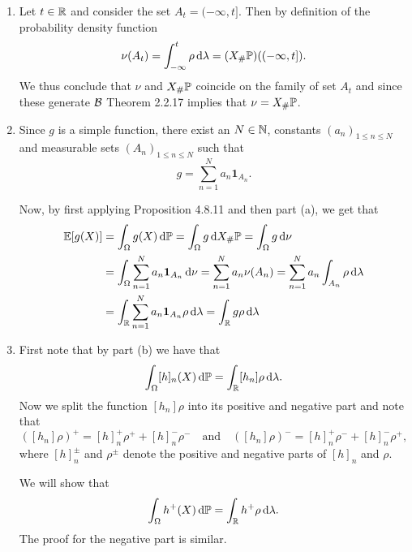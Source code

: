 \begin{enumerate}[label=(\alph*)]
\item Let $t \in \mathbb R$ and consider the set $A_t = (-\infty, t]$. Then by definition of the probability density function
\[
	\nu(A_t) = \int_{-\infty}^t \rho \, \mathrm{d} \lambda = (X_\# \mathbb P)((-\infty, t]).
\]
We thus conclude that $\nu$ and $X_\# \mathbb P$ coincide on the family of set $A_t$ and since these generate $\mathcal B$ Theorem 2.2.17 implies that $\nu = X_\# \mathbb P$.
\item Since $g$ is a simple function, there exist an $N \in \mathbb N$, constants $(a_n)_{1 \le n \le N}$ and measurable sets $(A_n)_{1 \le n \le N}$ such that
\[
	g = \sum_{n = 1}^N a_n \mathbf{1}_{A_n}.
\]

Now, by first applying Proposition 4.8.11 and then part (a), we get that
\begin{align*}
	\mathbb E[g(X)] &= \int_{\Omega} g(X) \, \mathrm{d} \mathbb P
		= \int_{\Omega} g \, \mathrm{d} X_\# \mathbb P 
		= \int_\Omega g \, \mathrm{d} \nu \\
	&= \int_\Omega \sum_{n = 1}^N a_n \mathbf{1}_{A_n} \, \mathrm{d} \nu 
		= \sum_{n = 1}^N a_n \nu(A_n) 
		= \sum_{n = 1}^N a_n \int_{A_n} \rho \, \mathrm{d} \lambda \\
	&= \int_{\mathbb R} \sum_{n = 1}^N a_n \mathbf{1}_{A_n} \rho \, \mathrm{d} \lambda = \int_{\mathbb R} g \rho \, \mathrm{d} \lambda
\end{align*}

\item First note that by part (b) we have that
\[
	\int_\Omega [h]_n(X) \, \mathrm{d} \mathbb P = \int_{\mathbb R} [h_n] \rho \, \mathrm{d} \lambda.
\]
Now we split the function $[h_n] \rho$ into its positive and negative part and note that
\[
	([h_n] \rho)^+ = [h]_n^+ \rho^+ + [h]_n^- \rho^- \quad \text{and} \quad
	([h_n] \rho)^- = [h]_n^+ \rho^- + [h]_n^- \rho^+,
\] 
where $[h]_n^\pm$ and $\rho^\pm$ denote the positive and negative parts of $[h]_n$ and $\rho$.

We will show that 
\[
	\int_\Omega h^+(X) \, \mathrm{d} \mathbb P = \int_{\mathbb R} h^+ \rho \, \mathrm{d} \lambda. 
\]
The proof for the negative part is similar.


\end{enumerate}
